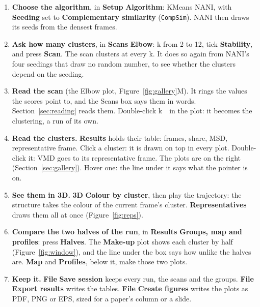 \documentclass[11pt,letterpaper]{article}
\newcommand{\ui}[1]{\textsf{\textbf{#1}}}
\newcommand{\then}{\,\raisebox{0.15ex}{\scalebox{0.6}{$\blacktriangleright$}}\,}
\newcommand{\cmd}[1]{\texttt{#1}}
\begin{document}
\begin{enumerate}[leftmargin=*,label=\textbf{\arabic*.},itemsep=0.6ex]
  Leave \ui{Fit to the first frame} off: the frames are fitted already. The
  note under it compares a sample of them with the first: \qsAsIs\,\AA\ as they
  are, \qsFitted\,\AA\ once fitted. They look superposed. (Frames that are not
  would come far nearer once fitted: the note would turn red-brown.) The run's
  summary will say \emph{not fitted}: the plugin's own fit is off.
\item \textbf{Choose the algorithm}, in \ui{Setup}\then\ui{Algorithm}: KMeans
  NANI, with \ui{Seeding} set to \ui{Complementary similarity}
  (\cmd{CompSim}). NANI then draws its seeds from the densest frames.
\item \textbf{Ask how many clusters}, in \ui{Scans}\then\ui{Elbow}: k from 2 to
  12, tick \ui{Stability}, and press \ui{Scan}. The scan clusters at every k.
  It does so again from NANI's four seedings that draw no random number, to
  see whether the clusters depend on the seeding.
\item \textbf{Read the scan} (the Elbow plot, Figure~\ref{fig:gallery}M). It
  rings the values the scores point to, and the Scans box says them in words.
  Section~\ref{sec:reading} reads them. Double-click k~\qsK\ in the plot: it
  becomes the clustering, a run of its own.
\item \textbf{Read the clusters.} \ui{Results} holds their table: frames,
  share, MSD, representative frame. Click a cluster: it is drawn on top in
  every plot. Double-click it: VMD goes to its representative frame. The plots
  are on the right (Section~\ref{sec:gallery}). Hover one: the line under it
  says what the pointer is on.
\item \textbf{See them in 3D.} \ui{3D}\then\ui{Colour by cluster}, then play the
  trajectory: the structure takes the colour of the current frame's cluster.
  \ui{Representatives} draws them all at once (Figure~\ref{fig:reps}).
\item \textbf{Compare the two halves of the run}, in
  \ui{Results}\then\ui{Groups, map and profiles}: press \ui{Halves}. The
  \ui{Make-up} plot shows each cluster by half (Figure~\ref{fig:window}), and
  the line under the box says how unlike the halves are. \ui{Map} and
  \ui{Profiles}, below it, make those two plots.
\item \textbf{Keep it.} \ui{File}\then\ui{Save session} keeps every run, the
  scans and the groups. \ui{File}\then\ui{Export results} writes the tables.
  \ui{File}\then\ui{Create figures} writes the plots as PDF, PNG or EPS, sized
  for a paper's column or a slide.
\end{enumerate}
\end{document}
